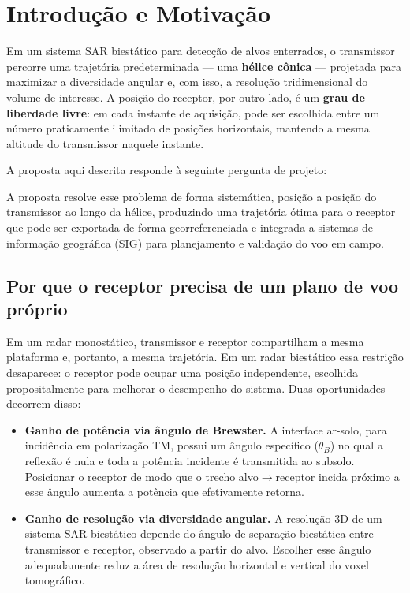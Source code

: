 \documentclass[11pt,a4paper]{article}
\newcommand{\thetaB}{\theta_B}
\begin{document}
\section{Introdução e Motivação}

Em um sistema SAR biestático para detecção de alvos enterrados, o transmissor percorre uma
trajetória predeterminada — uma \textbf{hélice cônica} — projetada para maximizar a diversidade
angular e, com isso, a resolução tridimensional do volume de interesse. A posição do receptor,
por outro lado, é um \textbf{grau de liberdade livre}: em cada instante de aquisição, pode ser
escolhida entre um número praticamente ilimitado de posições horizontais, mantendo a mesma
altitude do transmissor naquele instante.

A proposta aqui descrita responde à seguinte pergunta de projeto:

\begin{center}
\end{center}

A proposta resolve esse problema de forma sistemática, posição a posição do transmissor ao longo
da hélice, produzindo uma trajetória ótima para o receptor que pode ser exportada de forma
georreferenciada e integrada a sistemas de informação geográfica (SIG) para planejamento e
validação do voo em campo.

\subsection{Por que o receptor precisa de um plano de voo próprio}

Em um radar monostático, transmissor e receptor compartilham a mesma plataforma e, portanto, a
mesma trajetória. Em um radar biestático essa restrição desaparece: o receptor pode ocupar uma
posição independente, escolhida propositalmente para melhorar o desempenho do sistema. Duas
oportunidades decorrem disso:

\begin{itemize}
  \item \textbf{Ganho de potência via ângulo de Brewster.} A interface ar-solo, para incidência
  em polarização TM, possui um ângulo específico ($\thetaB$) no qual a reflexão é nula e toda a
  potência incidente é transmitida ao subsolo. Posicionar o receptor de modo que o trecho
  alvo$\to$receptor incida próximo a esse ângulo aumenta a potência que efetivamente retorna.
  \item \textbf{Ganho de resolução via diversidade angular.} A resolução 3D de um sistema SAR
  biestático depende do ângulo de separação biestática entre transmissor e receptor, observado a
  partir do alvo. Escolher esse ângulo adequadamente reduz a área de resolução horizontal e
  vertical do voxel tomográfico.
\end{itemize}
\end{document}
